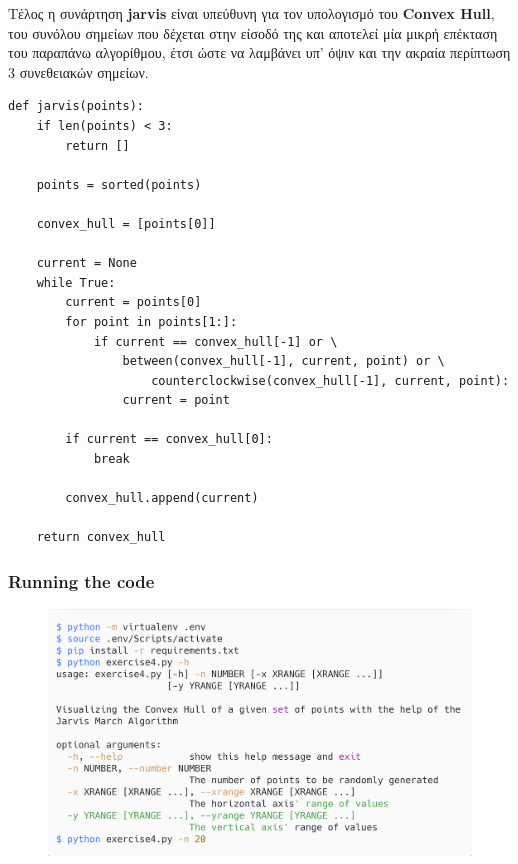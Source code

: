 \documentclass[12pt]{article}
\newenvironment{matlab}
	{\begin{figure}[H]\centering\captionsetup{justification=centering}}
	{\end{figure}}
\begin{document}
\pagebreak

Τέλος η συνάρτηση \textbf{jarvis} είναι υπεύθυνη για τον υπολογισμό
του \textbf{Convex Hull}, του συνόλου σημείων που δέχεται στην είσοδό
της και αποτελεί μία μικρή επέκταση του παραπάνω αλγορίθμου, έτσι ώστε
να λαμβάνει υπ' όψιν και την ακραία περίπτωση 3 συνεθειακών σημείων. \\

\begin{lstlisting}
def jarvis(points):
    if len(points) < 3:
        return []

    points = sorted(points)

    convex_hull = [points[0]]

    current = None
    while True:
        current = points[0]
        for point in points[1:]:
            if current == convex_hull[-1] or \
                between(convex_hull[-1], current, point) or \
                    counterclockwise(convex_hull[-1], current, point):
                current = point

        if current == convex_hull[0]:
            break

        convex_hull.append(current)

    return convex_hull
\end{lstlisting}

\pagebreak

\subsubsection*{Running the code}

\begin{matlab}
    \includegraphics[scale=0.140]{images/gift_wrapping_algorithm.png}
\end{matlab}
\end{document}
